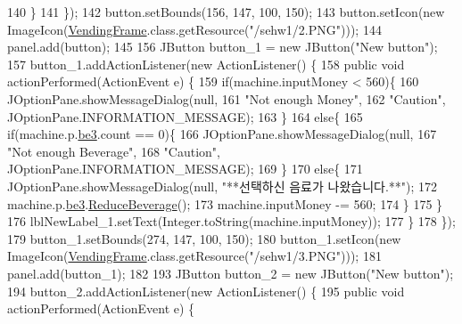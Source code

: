 \begin{DoxyCode}
140             \}
141         \});
142         button.setBounds(156, 147, 100, 150);
143         button.setIcon(\textcolor{keyword}{new} ImageIcon(\hyperlink{classsehw1_1_1_vending_frame_a82f3d8fe653c04d594b0a46e751328a0}{VendingFrame}.class.getResource(\textcolor{stringliteral}{"/sehw1/2.PNG"})));
144         panel.add(button);
145         
156         JButton button\_1 = \textcolor{keyword}{new} JButton(\textcolor{stringliteral}{"New button"});
157         button\_1.addActionListener(\textcolor{keyword}{new} ActionListener() \{
158             \textcolor{keyword}{public} \textcolor{keywordtype}{void} actionPerformed(ActionEvent e) \{
159                 \textcolor{keywordflow}{if}(machine.inputMoney < 560)\{
160                     JOptionPane.showMessageDialog(null,
161                             \textcolor{stringliteral}{"Not enough Money"}, 
162                             \textcolor{stringliteral}{"Caution"}, JOptionPane.INFORMATION\_MESSAGE);
163                 \}
164                 \textcolor{keywordflow}{else}\{
165                     \textcolor{keywordflow}{if}(machine.p.\hyperlink{classsehw1_1_1product_a15f8a47cd14f9b7fc8faf4fa5836d125}{be3}.count == 0)\{
166                         JOptionPane.showMessageDialog(null,
167                                 \textcolor{stringliteral}{"Not enough Beverage"}, 
168                                 \textcolor{stringliteral}{"Caution"}, JOptionPane.INFORMATION\_MESSAGE);
169                     \}
170                     \textcolor{keywordflow}{else}\{
171                         JOptionPane.showMessageDialog(null, \textcolor{stringliteral}{"**선택하신 음료가 나왔습니다.**"});
172                         machine.p.\hyperlink{classsehw1_1_1product_a15f8a47cd14f9b7fc8faf4fa5836d125}{be3}.\hyperlink{classsehw1_1_1beverage_ad2c40378698fb6c31c8f02bddb2a4e29}{ReduceBeverage}();
173                         machine.inputMoney -= 560;
174                     \}
175                 \}
176                 lblNewLabel\_1.setText(Integer.toString(machine.inputMoney));
177             \}
178         \});
179         button\_1.setBounds(274, 147, 100, 150);
180         button\_1.setIcon(\textcolor{keyword}{new} ImageIcon(\hyperlink{classsehw1_1_1_vending_frame_a82f3d8fe653c04d594b0a46e751328a0}{VendingFrame}.class.getResource(\textcolor{stringliteral}{"/sehw1/3.PNG"})));
181         panel.add(button\_1);
182         
193         JButton button\_2 = \textcolor{keyword}{new} JButton(\textcolor{stringliteral}{"New button"});
194         button\_2.addActionListener(\textcolor{keyword}{new} ActionListener() \{
195             \textcolor{keyword}{public} \textcolor{keywordtype}{void} actionPerformed(ActionEvent e) \{

\end{DoxyCode}
